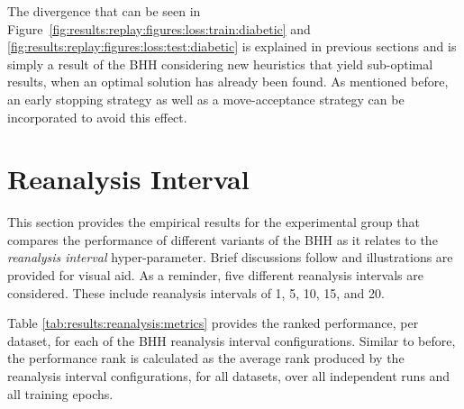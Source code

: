 The divergence that can be seen in Figure~\ref{fig:results:replay:figures:loss:train:diabetic} and \ref{fig:results:replay:figures:loss:test:diabetic} is explained in previous sections and is simply a result of the \acs{BHH} considering new heuristics that yield sub-optimal results, when an optimal solution has already been found. As mentioned before, an early stopping strategy as well as a move-acceptance strategy can be incorporated to avoid this effect.

\section{Reanalysis Interval}\label{sec:results:reanalysis}

This section provides the empirical results for the experimental group that compares the performance of different variants of the \acs{BHH} as it relates to the \textit{reanalysis interval} hyper-parameter. Brief discussions follow and illustrations are provided for visual aid. As a reminder, five different reanalysis intervals are considered. These include reanalysis intervals of 1, 5, 10, 15, and 20.

Table \ref{tab:results:reanalysis:metrics} provides the ranked performance, per dataset, for each of the \acs{BHH} reanalysis interval configurations. Similar to before, the performance rank is calculated as the average rank produced by the reanalysis interval configurations, for all datasets, over all independent runs and all training epochs.

